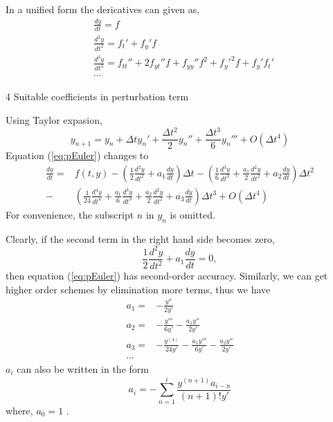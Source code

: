 \documentclass[review]{elsarticle}
\theoremstyle{plain}\newtheorem{definition}{\sc{Definition}}
\theoremstyle{defination}\newtheorem{example}{Example}[section]
\numberwithin{equation}{section}
\numberwithin{table}{section}
\begin{document}
{In a unified form the dericatives can given as,        
\begin{equation}
  \begin{aligned}
  &\frac{dy}{dt} = f\\
  &\frac{d^2y}{dt^2} = f_t'+f_y'f\\
  &\frac{d^3y}{dt^3} = f_{tt}''+2f_{yt}''f+f_{yy}''f^2+{f_y'}^2f+f_y'f_t'\\
  &\cdots
\end{aligned}
\end{equation}

\textcircled{\small {4}} Suitable coefficients in perturbation term

Using Taylor expasion, 
\begin{equation}
  y_{n+1}=y_n + \Delta t y_n' + \frac{\Delta t^2}{2} y_n'' + \frac{\Delta t^3}{6} y_n''' + O(\Delta t^4 )
  \end{equation}
Equation (\ref{eq:pEuler}) changes to
\begin{equation}
  \begin{aligned}
  \frac{dy}{dt}=&f(t,y)-\left(\frac{1}{2}\frac{d^2y}{dt^2}+a_1\frac{dy}{dt}\right)\Delta t - \left( \frac{1}{6}\frac{d^3 y}{dt^3}+\frac{a_1}{2}\frac{d^2y}{dt^2}+a_2\frac{dy}{dt}\right) \Delta t^2 \\
  -&\left(\frac{1}{24}\frac{d^4y}{dt^4}+\frac{a_1}{6}\frac{d^3y}{dt^3}+\frac{a_2}{2}\frac{d^2y}{dt^2}+a_3 \frac{dy}{dt}\right) \Delta t^3 +O(\Delta t^4) 
  \end{aligned}
  \end{equation}
For convenience, the subscript $n$  in  $y_n$ is omitted. 

  Clearly, if the second term in the right hand side becomes zero,
\begin{equation}
  \frac{1}{2}\frac{d^2y}{dt^2}+a_1\frac{dy}{dt}=0,
  \end{equation}
then equation (\ref{eq:pEuler}) has second-order accuracy. Similarly, we can get higher order schemes by elimination more terms, thus we have 
\begin{equation}\label{eq:ai}
  \begin{aligned}
	a_1 =&- \frac{y''}{2y'}\\
	a_2=&-\frac{y'''}{6y'}-\frac{a_1y''}{2y'}\\
	a_3=&-\frac{y^{(4)}}{24y'}-\frac{a_1y'''}{6y'}-\frac{a_2y''}{2y'}\\
	\cdots
	\end{aligned}
	\end{equation}
$a_i$ can also be written in the form
\begin{equation}
  a_i=-\sum_{n=1}^i \frac{y^{(n+1)}a_{i-n}}{(n+1)!y'}
  \end{equation}
where, $a_0=1$ .

}
\end{document}

